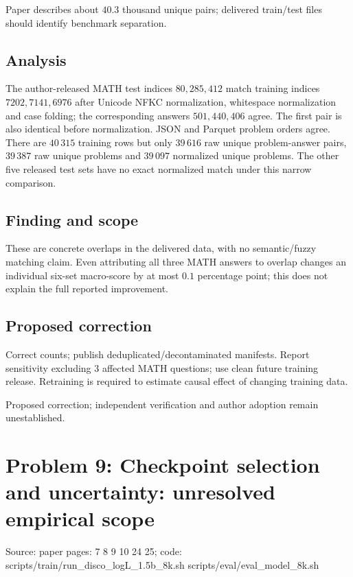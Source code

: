 \documentclass[11pt]{article}
\begin{document}
Paper describes about \(40.3\) thousand unique pairs; delivered train/test files should identify benchmark separation.

\subsection*{Analysis}

The author-released MATH test indices \(80,285,412\) match training indices \(7202,7141,6976\) after Unicode NFKC normalization, whitespace normalization and case folding; the corresponding answers \(501,440,406\) agree. The first pair is also identical before normalization. JSON and Parquet problem orders agree. There are \(40\,315\) training rows but only \(39\,616\) raw unique problem-answer pairs, \(39\,387\) raw unique problems and \(39\,097\) normalized unique problems. The other five released test sets have no exact normalized match under this narrow comparison.

\subsection*{Finding and scope}

These are concrete overlaps in the delivered data, with no semantic/fuzzy matching claim. Even attributing all three MATH answers to overlap changes an individual six-set macro-score by at most \(0.1\) percentage point; this does not explain the full reported improvement.

\subsection*{Proposed correction}

Correct counts; publish deduplicated/decontaminated manifests. Report sensitivity excluding \(3\) affected MATH questions; use clean future training release. Retraining is required to estimate causal effect of changing training data.

Proposed correction; independent verification and author adoption remain unestablished.

\section*{Problem 9: Checkpoint selection and uncertainty: unresolved empirical scope}

Source: paper pages: 7 8 9 10 24 25; code: scripts/train/run\_disco\_logL\_1.5b\_8k.sh scripts/eval/eval\_model\_8k.sh
\end{document}
